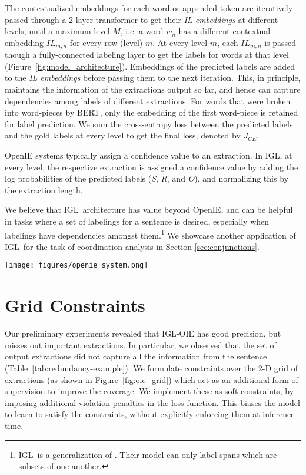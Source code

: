 \documentclass[11pt,a4paper]{article}
\newcommand{\shortname}{{\scshape IGL}}
\begin{document}
The contextualized embeddings for each word or appended token are iteratively passed through a 2-layer transformer to get their \textit{IL embeddings} at different levels, until a maximum level $M$, i.e. a word $w_n$ has a different contextual embedding $IL_{m,n}$ for every row (level) $m$. At every level $m$, each $IL_{m,n}$ is passed though a fully-connected labeling layer to get the labels for words at that level (Figure~\ref{fig:model_architecture}). Embeddings of the predicted labels are added to the \textit{IL embeddings} before passing them to the next iteration. This, in principle, maintains the information of the extractions output so far, and hence can capture dependencies among labels of different extractions.
For words that were broken into word-pieces by BERT, only the embedding of the first word-piece is retained for label prediction. We sum the  cross-entropy loss between the predicted labels and the gold labels at every level to get the final loss, denoted by $J_{CE}$.


OpenIE systems typically assign a confidence value to an extraction. In \shortname, at every level, the respective extraction is assigned a confidence value by adding the log probabilities of 
the predicted labels (\textit{S}, \textit{R}, and \textit{O}), and normalizing this by the extraction length.

We believe that \shortname\ architecture has value beyond OpenIE, and can be helpful in tasks where a set of labelings for a sentence is desired, especially when labelings have dependencies amongst them.\footnote{\shortname\ is a generalization of \citet{ju&a18}. Their model can only label spans which are subsets of one another.}  We showcase another application of \shortname~for the task of coordination analysis in Section \ref{sec:conjunctions}.

 
\begin{figure*}[htp]
\texttt{[image: figures/openie\_system.png]}
\hfill
\vspace*{-1ex}
\caption{The final OpenIE system. \shortname-CA identifies conjunct boundaries by labeling a 2-D grid. This generates simple sentences and C\shortname-OIE emits the final extractions.}
\label{fig:oie_system}
\end{figure*}

\section{Grid Constraints}
\label{sec:constraints}
Our preliminary experiments revealed that \shortname-OIE has good precision, but misses out important extractions. In particular, we observed that the set of output extractions did not capture all the information from the sentence (Table~\ref{tab:redundancy-example}). We formulate constraints over the 2-D grid of extractions (as shown in Figure~\ref{fig:oie_grid}) which act as an additional form of supervision to improve the coverage. We implement these as soft constraints, by imposing additional violation penalties in the loss function.
This biases the model to learn to satisfy the constraints, without explicitly enforcing them at inference time.
\end{document}
